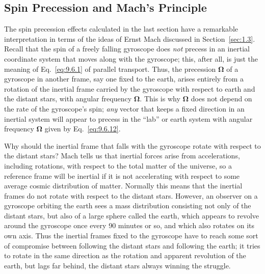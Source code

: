 
\subsection{Spin Precession and Mach's Principle\optionalreading}\label{sec:9.7}

The spin precession effects calculated in the last section have a remarkable
interpretation in terms of the ideas of Ernst Mach discussed in
Section~\ref{sec:1.3}. Recall that the spin of a freely falling gyroscope
does \emph{not} precess in an inertial coordinate system that moves along
with the gyroscope; this, after all, is just the meaning of
Eq.~\eqref{eq:9.6.1} of parallel transport. Thus, the precession
\(\boldsymbol\Omega\) of a gyroscope in another frame, say one fixed to the
earth, arises entirely from a rotation of the inertial frame carried by the
gyroscope with respect to earth and the distant stars, with angular
frequency \(\boldsymbol\Omega\). This is why \(\boldsymbol\Omega\) does not
depend on the rate of the gyroscope's spin; \emph{any} vector that keeps a
fixed direction in an inertial system will appear to precess in the ``lab''
or earth system with angular frequency \(\boldsymbol\Omega\) given by
Eq.~\eqref{eq:9.6.12}.

Why should the inertial frame that falls with the gyroscope rotate with
respect to the distant stars? Mach tells us that inertial forces arise from
accelerations, including rotations, with respect to the total matter of the
universe, so a reference frame will be inertial if it is not accelerating
with respect to some average cosmic distribution of matter. Normally this
means that the inertial frames do not rotate with respect to the distant
stars. However, an observer on a gyroscope orbiting the earth sees a mass
distribution consisting not only of the distant stars, but also of a large
sphere called the earth, which appears to revolve around the gyroscope once
every 90 minutes or so, and which also rotates on its own axis. Thus the
inertial frames fixed to the gyroscope have to reach some sort of compromise
between following the distant stars and following the earth; it tries to
rotate in the same direction as the rotation and apparent revolution of the
earth, but lags far behind, the distant stars always winning the struggle.

